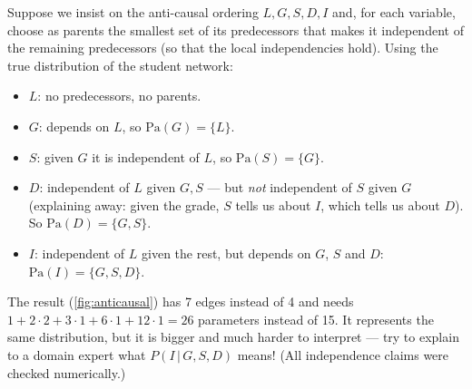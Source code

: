 \documentclass[11pt, oneside]{book}
\newcommand{\Prob}{\mathbb{P}}           %
\newcommand{\given}{\,\vert\,}           %
\newcommand{\Pa}{\mathrm{Pa}}            %
\begin{document}
\begin{exbox}[title={The student network, built backwards}]
Suppose we insist on the anti-causal ordering $L, G, S, D, I$ and, for each
variable, choose as parents the smallest set of its predecessors that makes it
independent of the remaining predecessors (so that the local independencies
hold). Using the true distribution of the student network:
\begin{itemize}
  \item $L$: no predecessors, no parents.
  \item $G$: depends on $L$, so $\Pa(G) = \{L\}$.
  \item $S$: given $G$ it is independent of $L$, so $\Pa(S) = \{G\}$.
  \item $D$: independent of $L$ given $G, S$ --- but \emph{not} independent of
    $S$ given $G$ (explaining away: given the grade, $S$ tells us about $I$,
    which tells us about $D$). So $\Pa(D) = \{G, S\}$.
  \item $I$: independent of $L$ given the rest, but depends on $G$, $S$ and
    $D$: $\Pa(I) = \{G, S, D\}$.
\end{itemize}
The result (\cref{fig:anticausal}) has 7 edges instead of 4 and needs
$1 + 2 \cdot 2 + 3 \cdot 1 + 6 \cdot 1 + 12 \cdot 1 = 26$ parameters instead of
15. It represents the same distribution, but it is bigger and much harder to
interpret --- try to explain to a domain expert what $P(I \given G, S, D)$
means! (All independence claims were checked numerically.)
\end{exbox}
\end{document}
